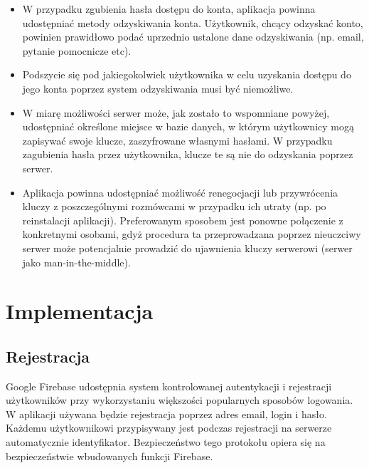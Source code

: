 \documentclass{article}
\begin{document}
\begin{itemize}
\item W przypadku zgubienia hasła dostępu do konta, aplikacja powinna udostępniać metody odzyskiwania konta. Użytkownik,
chcący odzyskać konto, powinien prawidłowo podać uprzednio ustalone dane odzyskiwania (np. email, pytanie pomocnicze etc).

\item Podszycie się pod jakiegokolwiek użytkownika w celu uzyskania dostępu do jego konta poprzez system odzyskiwania
musi być niemożliwe.

\item W miarę możliwości serwer może, jak zostało to wspomniane powyżej, udostępniać określone miejsce w bazie danych, w którym użytkownicy mogą
zapisywać swoje klucze, zaszyfrowane własnymi hasłami. W przypadku zagubienia hasła przez użytkownika, klucze te są nie
do odzyskania poprzez serwer. 

\item Aplikacja powinna udostępniać możliwość renegocjacji lub przywrócenia kluczy z poszczególnymi rozmówcami w przypadku
ich utraty (np. po reinstalacji aplikacji). Preferowanym sposobem jest ponowne połączenie z konkretnymi osobami,
gdyż procedura ta przeprowadzana poprzez nieuczciwy serwer może potencjalnie prowadzić do ujawnienia kluczy serwerowi
(serwer jako man-in-the-middle).
\end{itemize}

\section{Implementacja}

\subsection{Rejestracja}

Google Firebase udostępnia system kontrolowanej autentykacji i rejestracji użytkowników przy wykorzystaniu większości
popularnych sposobów logowania. W aplikacji używana będzie rejestracja poprzez adres email, login i hasło. 
Każdemu użytkownikowi przypisywany jest podczas rejestracji na serwerze automatycznie identyfikator. Bezpieczeństwo
tego protokołu opiera się na bezpieczeństwie wbudowanych funkcji Firebase.
\end{document}
